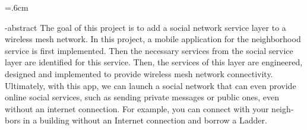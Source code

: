 
\baselineskip=.6cm
\begin{latin}
\en-abstract{
The goal of this project is to add a social network service layer to a wireless mesh network. In this project, a mobile application for the neighborhood service is first implemented. Then the necessary services from the social service layer are identified for this service. Then, the services of this layer are engineered, designed and implemented to provide wireless mesh network connectivity. Ultimately, with this app, we can launch a social network that can even provide online social services, such as sending private messages or public ones, even without an internet connection. For example, you can connect with your neighbors in a building without an Internet connection and borrow a Ladder.
}
\latinfirstPage
\end{latin}
